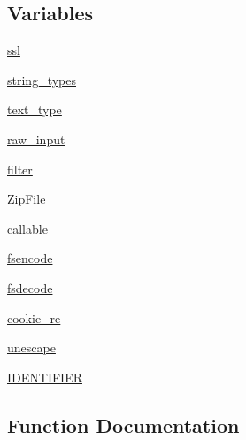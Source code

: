 \subsection*{Variables}
\begin{DoxyCompactItemize}
\item 
\hyperlink{namespacepip_1_1__vendor_1_1distlib_1_1compat_a84c90c4164705915c8f1971d2b9493ea}{ssl}
\item 
\hyperlink{namespacepip_1_1__vendor_1_1distlib_1_1compat_ab2b53c50c69e2a812f4d5e9533b9936d}{string\+\_\+types}
\item 
\hyperlink{namespacepip_1_1__vendor_1_1distlib_1_1compat_a7997dc5a9dc74071d41f3bc4275e6466}{text\+\_\+type}
\item 
\hyperlink{namespacepip_1_1__vendor_1_1distlib_1_1compat_a98e8b3f5886a71cd891de3e8e7808e6c}{raw\+\_\+input}
\item 
\hyperlink{namespacepip_1_1__vendor_1_1distlib_1_1compat_a1fc1d388e827a805bed7401d051d1483}{filter}
\item 
\hyperlink{namespacepip_1_1__vendor_1_1distlib_1_1compat_ac32314a03de7691105f92d246ceda87a}{Zip\+File}
\item 
\hyperlink{namespacepip_1_1__vendor_1_1distlib_1_1compat_a675fe09a4c6771be747845f721993abe}{callable}
\item 
\hyperlink{namespacepip_1_1__vendor_1_1distlib_1_1compat_a758c729ca84c2423befbb3a9ace7339c}{fsencode}
\item 
\hyperlink{namespacepip_1_1__vendor_1_1distlib_1_1compat_a807d5dd8d6cc6fd91a6d4b2e66d74416}{fsdecode}
\item 
\hyperlink{namespacepip_1_1__vendor_1_1distlib_1_1compat_a2b0c4b6e3011f9af41bc22450b9fa54a}{cookie\+\_\+re}
\item 
\hyperlink{namespacepip_1_1__vendor_1_1distlib_1_1compat_a90310af51b9d53806695e188f51fc0f6}{unescape}
\item 
\hyperlink{namespacepip_1_1__vendor_1_1distlib_1_1compat_a5a531ae2ea0f78ec63eda206a0939304}{I\+D\+E\+N\+T\+I\+F\+I\+ER}
\end{DoxyCompactItemize}


\subsection{Function Documentation}
\mbox{\label{namespacepip_1_1__vendor_1_1distlib_1_1compat_ab5d2e81943c5fe462bf1252c99ed5f41}} 
